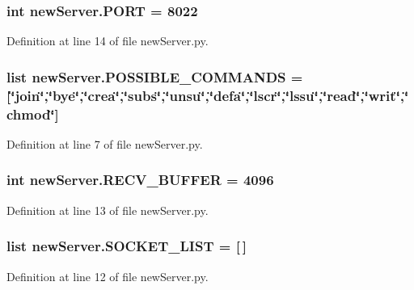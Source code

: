 \hypertarget{namespacenew_server_a10c03320240322f838e9f19a686e825d}{}
\subsubsection[{P\+O\+R\+T}]{\setlength{\rightskip}{0pt plus 5cm}int new\+Server.\+P\+O\+R\+T = 8022}\label{namespacenew_server_a10c03320240322f838e9f19a686e825d}


Definition at line 14 of file new\+Server.\+py.

\hypertarget{namespacenew_server_a85c087d4ca25a1782111a4dca1169b6d}{}
\subsubsection[{P\+O\+S\+S\+I\+B\+L\+E\+\_\+\+C\+O\+M\+M\+A\+N\+D\+S}]{\setlength{\rightskip}{0pt plus 5cm}list new\+Server.\+P\+O\+S\+S\+I\+B\+L\+E\+\_\+\+C\+O\+M\+M\+A\+N\+D\+S = \mbox{[}\char`\"{}join\char`\"{},\char`\"{}bye\char`\"{},\char`\"{}crea\char`\"{},\char`\"{}subs\char`\"{},\char`\"{}unsu\char`\"{},\char`\"{}defa\char`\"{},\char`\"{}lscr\char`\"{},\char`\"{}lssu\char`\"{},\char`\"{}read\char`\"{},\char`\"{}writ\char`\"{},\char`\"{}chmod\char`\"{}\mbox{]}}\label{namespacenew_server_a85c087d4ca25a1782111a4dca1169b6d}


Definition at line 7 of file new\+Server.\+py.

\hypertarget{namespacenew_server_a7d87ef1942af615eeec258c226e5b859}{}
\subsubsection[{R\+E\+C\+V\+\_\+\+B\+U\+F\+F\+E\+R}]{\setlength{\rightskip}{0pt plus 5cm}int new\+Server.\+R\+E\+C\+V\+\_\+\+B\+U\+F\+F\+E\+R = 4096}\label{namespacenew_server_a7d87ef1942af615eeec258c226e5b859}


Definition at line 13 of file new\+Server.\+py.

\hypertarget{namespacenew_server_a0472f2f3fb3afb95020b3c9ea29c0af4}{}
\subsubsection[{S\+O\+C\+K\+E\+T\+\_\+\+L\+I\+S\+T}]{\setlength{\rightskip}{0pt plus 5cm}list new\+Server.\+S\+O\+C\+K\+E\+T\+\_\+\+L\+I\+S\+T = \mbox{[}$\,$\mbox{]}}\label{namespacenew_server_a0472f2f3fb3afb95020b3c9ea29c0af4}


Definition at line 12 of file new\+Server.\+py.

